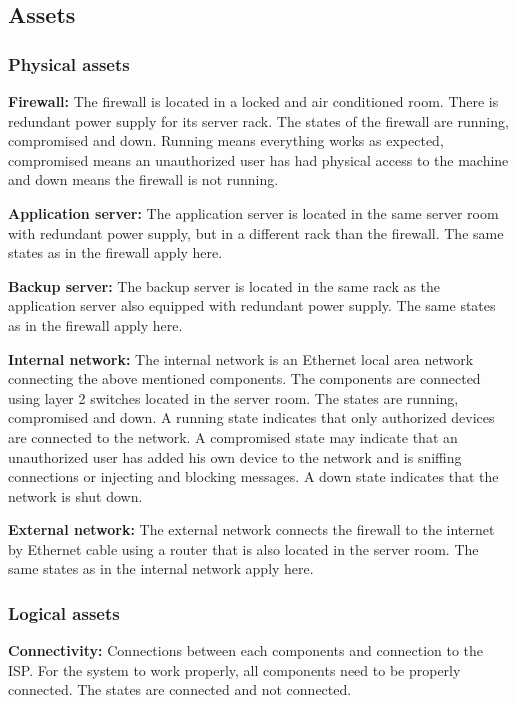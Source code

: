 \documentclass[english]{article}
\begin{document}
\subsection{Assets}

\subsubsection{Physical assets}

	\begin{description}
		\item{\textbf{Firewall:}} The firewall is located in a locked and air conditioned room. There is redundant power supply for its server rack. The states of the firewall are running, compromised and down. Running means everything works as expected, compromised means an unauthorized user has had physical access to the machine and down means the firewall is not running.
		\item{\textbf{Application server:}} The application server is located in the same server room with redundant power supply, but in a different rack than the firewall. The same states as in the firewall apply here.
		\item{\textbf{Backup server:}} The backup server is located in the same rack as the application server also equipped with redundant power supply. The same states as in the firewall apply here.
		\item{\textbf{Internal network:}} The internal network is an Ethernet local area network connecting the above mentioned components. The components are connected using layer 2 switches located in the server room. The states are running, compromised and down. A running state indicates that only authorized devices are connected to the network. A compromised state may indicate that an unauthorized user has added his own device to the network and is sniffing connections or injecting and blocking messages. A down state indicates that the network is shut down.
		\item{\textbf{External network:}} The external network connects the firewall to the internet by Ethernet cable using a router that is also located in the server room. The same states as in the internal network apply here.
	\end{description}


\subsubsection{Logical assets}
	\begin{description}
		\item{\textbf{Connectivity:}} Connections between each components and connection to the ISP. For the system to work properly, all components need to be properly connected. The states are connected and not connected.
	\end{description}
\end{document}
